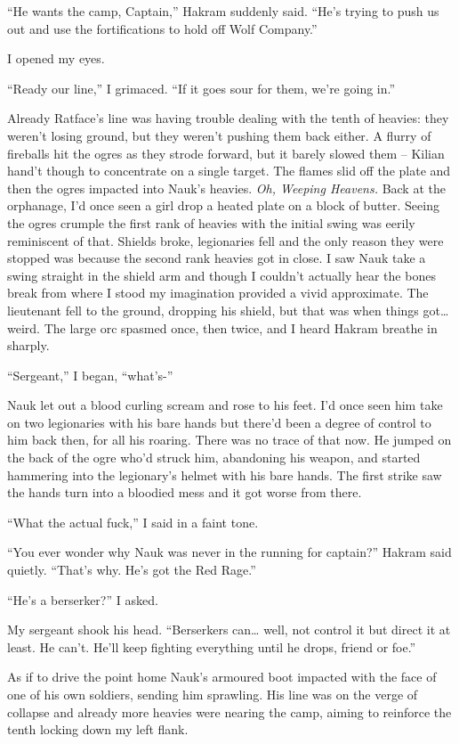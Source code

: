 \documentclass[12pt, openany]{book}
\begin{document}
“He wants the camp, Captain,” Hakram suddenly said. “He’s trying to push us out and use the fortifications to hold off Wolf Company.”

I opened my eyes.

“Ready our line,” I grimaced. “If it goes sour for them, we’re going in.”

Already Ratface’s line was having trouble dealing with the tenth of heavies: they weren’t losing ground, but they weren’t pushing them back either. A flurry of fireballs hit the ogres as they strode forward, but it barely slowed them – Kilian hand’t though to concentrate on a single target. The flames slid off the plate and then the ogres impacted into Nauk’s heavies. \textit{Oh, Weeping Heavens.} Back at the orphanage, I’d once seen a girl drop a heated plate on a block of butter. Seeing the ogres crumple the first rank of heavies with the initial swing was eerily reminiscent of that. Shields broke, legionaries fell and the only reason they were stopped was because the second rank heavies got in close. I saw Nauk take a swing straight in the shield arm and though I couldn’t actually hear the bones break from where I stood my imagination provided a vivid approximate. The lieutenant fell to the ground, dropping his shield, but that was when things got… weird. The large orc spasmed once, then twice, and I heard Hakram breathe in sharply.

“Sergeant,” I began, “what’s-”

Nauk let out a blood curling scream and rose to his feet. I’d once seen him take on two legionaries with his bare hands but there’d been a degree of control to him back then, for all his roaring. There was no trace of that now. He jumped on the back of the ogre who’d struck him, abandoning his weapon, and started hammering into the legionary’s helmet with his bare hands. The first strike saw the hands turn into a bloodied mess and it got worse from there.

“What the actual fuck,” I said in a faint tone.

“You ever wonder why Nauk was never in the running for captain?” Hakram said quietly. “That’s why. He’s got the Red Rage.”

“He’s a berserker?” I asked. 

My sergeant shook his head. “Berserkers can… well, not control it but direct it at least. He can’t. He’ll keep fighting everything until he drops, friend or foe.”

As if to drive the point home Nauk’s armoured boot impacted with the face of one of his own soldiers, sending him sprawling. His line was on the verge of collapse and already more heavies were nearing the camp, aiming to reinforce the tenth locking down my left flank. 
\end{document}
